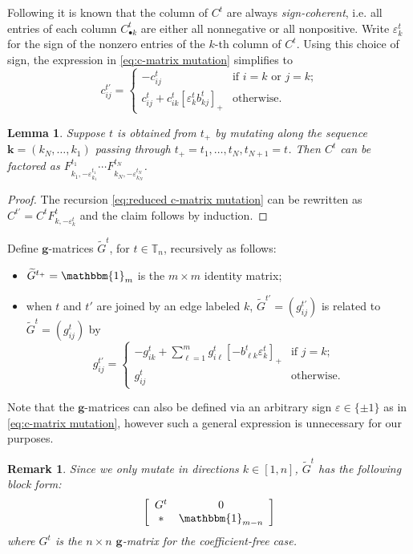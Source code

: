 \documentclass{amsart}
\newtheorem{lemma}[theorem]{Lemma}
\newtheorem{remark}[theorem]{Remark}
\numberwithin{theorem}{section}
\newcommand{\bfg}{\boldsymbol{g}}
\newcommand{\bfk}{{\boldsymbol{k}}}
\newcommand{\TT}{\mathbb{T}}
\newcommand{\bOne}{\mathbbm{1}}
\begin{document}
  Following \cite{keller,ghkk} it is known that the column of $C^t$ are always \emph{sign-coherent}, i.e. all entries of each column $C^t_{\bullet k}$ are either all nonnegative or all nonpositive.
  Write $\varepsilon^t_k$ for the sign of the nonzero entries of the $k$-th column of $C^t$.
  Using this choice of sign, the expression in \eqref{eq:c-matrix mutation} simplifies to
  \begin{equation}
    \label{eq:reduced c-matrix mutation}
    c^{t'}_{ij} = \begin{cases} -c^t_{ij} & \text{if $i=k$ or $j=k$;}\\ c^t_{ij} + c^t_{ik} [\varepsilon^t_k b^t_{kj}]_+ & \text{otherwise.} \end{cases}
  \end{equation}

  \begin{lemma}
    \label{le:c-matrix factorization}
    Suppose $t$ is obtained from $t_+$ by mutating along the sequence $\bfk=(k_N,\ldots,k_1)$ passing through $t_+=t_1,\ldots,t_N,t_{N+1}=t$.
    Then $C^t$ can be factored as $F^{t_1}_{k_1,-\varepsilon^{t_1}_{k_1}}\cdots F^{t_N}_{k_N,-\varepsilon^{t_N}_{k_N}}$.
  \end{lemma}
  \begin{proof}
    The recursion \eqref{eq:reduced c-matrix mutation} can be rewritten as $C^{t'}=C^t F^t_{k,-\varepsilon^t_k}$ and the claim follows by induction.
  \end{proof}

  Define $\bfg$-matrices $\widetilde G^t$, for $t\in\TT_n$, recursively as follows:
  \begin{itemize}
    \item $\widetilde G^{t_+} = \bOne_m$ is the $m\times m$ identity matrix;
    \item when $t$ and $t'$ are joined by an edge labeled $k$, $\widetilde G^{t'}=(g^{t'}_{ij})$ is related to $\widetilde G^t=(g^t_{ij})$ by
      \begin{equation}
        \label{eq:g-matrix mutation}
        g^{t'}_{ij} = \begin{cases} -g^t_{ik} + \sum\limits_{\ell=1}^m g^t_{i\ell} [-b^t_{\ell k} \varepsilon^t_k]_+ & \text{if $j=k$;}\\ g^t_{ij} & \text{otherwise.} \end{cases}
      \end{equation}
  \end{itemize}
  Note that the $\bfg$-matrices can also be defined via an arbitrary sign $\varepsilon\in\{\pm 1\}$ as in \eqref{eq:c-matrix mutation}, however such a general expression is unnecessary for our purposes.
  \begin{remark}
    Since we only mutate in directions $k\in[1,n]$, $\widetilde G^t$ has the following block form:
    \[\left[\begin{array}{cc} G^t & 0\\ * & \bOne_{m-n}\end{array}\right]\]
    where $G^t$ is the $n\times n$ $\bfg$-matrix for the coefficient-free case.
  \end{remark}
\end{document}
